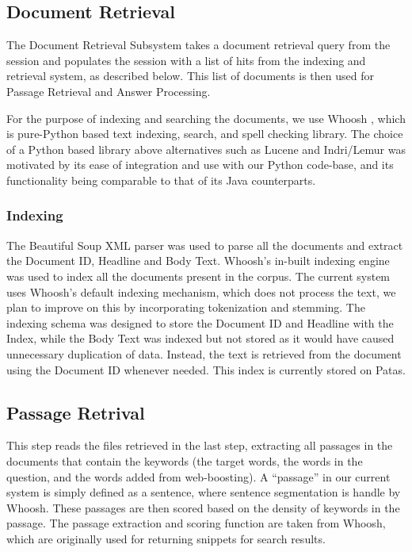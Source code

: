 \documentclass[11pt]{article}
\begin{document}
\subsection{Document Retrieval}
The Document Retrieval Subsystem takes a document retrieval query from the session and populates the session with a list of hits from the indexing and retrieval system, as described below. This list of documents is then used for Passage Retrieval and Answer Processing.

For the purpose of indexing and searching the documents, we use Whoosh \cite{whoosh}, which is pure-Python based text indexing, search, and spell checking library. The choice of a Python based library above alternatives such as Lucene and Indri/Lemur was motivated by its ease of integration and use with our Python code-base, and its functionality being comparable to that of its Java counterparts. 

\subsubsection{Indexing}
The Beautiful Soup XML parser \cite{bsoup} was used to parse all the documents and extract the Document ID, Headline and Body Text. Whoosh's in-built indexing engine was used to index all the documents present in the corpus. The current system uses Whoosh's default indexing mechanism, which does not process the text, we plan to improve on this by incorporating tokenization and stemming. The indexing schema was designed to store the Document ID and Headline with the Index, while the Body Text was indexed but not stored as it would have caused unnecessary duplication of data. Instead, the text is retrieved from the document using the Document ID whenever needed. This index is currently stored on Patas.

\subsection{Passage Retrival}
This step reads the files retrieved in the last step, extracting all passages in the documents that contain the keywords (the target words, the words in the question, and the words added from web-boosting). A ``passage'' in our current system is simply defined as a sentence, where sentence segmentation is handle by Whoosh. These passages are then scored based on the density of keywords in the passage. The passage extraction and scoring function are taken from Whoosh, which are originally used for returning snippets for search results.
\end{document}
